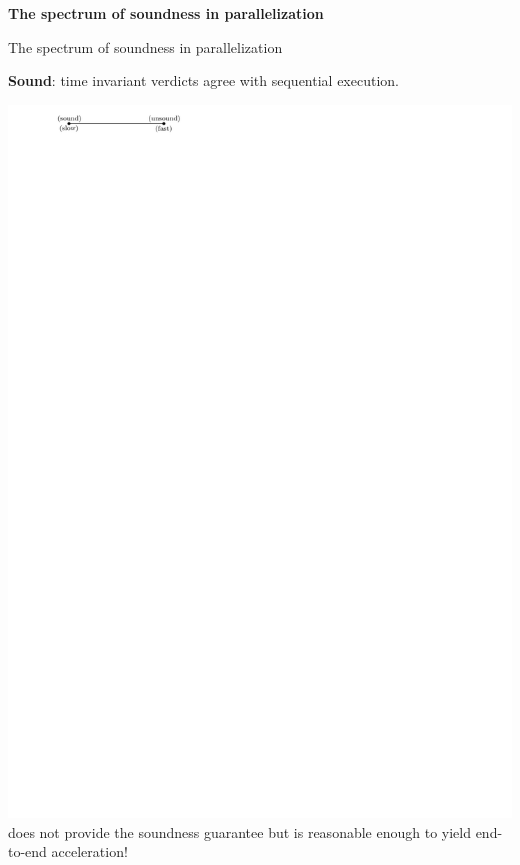 \documentclass{beamer}
\begin{document}
\begingroup
\renewcommand{\disp}{}
\begin{frame}
	\begin{center}
		{\rsm \textbf{The spectrum of soundness in parallelization}} 
	\end{center}
\end{frame}
\endgroup
\addtocounter{framenumber}{-1}

\begin{frame}{The spectrum of soundness in parallelization}
	
	{\textbf{\rsm Sound}: time invariant verdicts agree with sequential execution.}
	\begin{center}
		\includegraphics[width=0.8\linewidth,page=1]{images/spectrum.pdf}
		\vfill
		{\color{white}\tname{} does not provide the soundness guarantee but is reasonable enough to yield end-to-end acceleration!}
	\end{center}
\end{frame}
\end{document}
